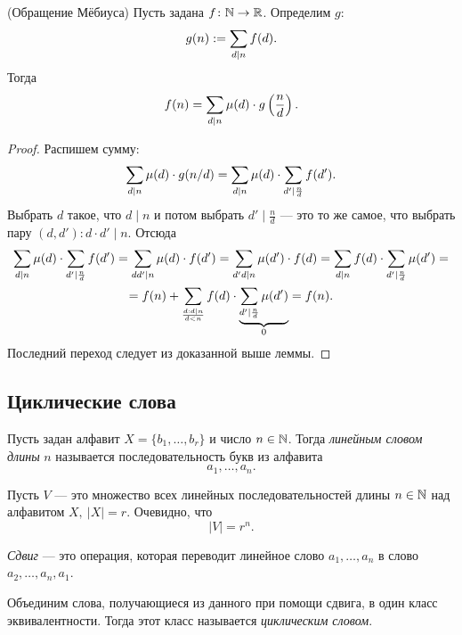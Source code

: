 \begin{theorem} (Обращение Мёбиуса)
	Пусть задана $f \colon \mathbb{N} \rightarrow \mathbb{R}$. Определим $g$:
	\[
		g(n) := \sum\limits_{d \mid n} f(d).
	\]
	Тогда
	\[
		f(n) = \sum\limits_{d \mid n} \mu(d) \cdot g\left(\frac{n}{d}\right).
	\]
\end{theorem}

\begin{proof}
	Распишем сумму:
	\[
		\sum\limits_{d \mid n} \mu(d) \cdot g(n / d) = \sum\limits_{d \mid n} \mu(d) \cdot \sum\limits_{d' \mid \frac{n}{d}} f(d').
	\]
	Выбрать $d$ такое, что $d \mid n$ и потом выбрать $d' \mid \frac{n}{d}$ --- это то же самое, что выбрать пару $(d, d'): d \cdot d' \mid n$. Отсюда
	\begin{multline*}
		\sum\limits_{d \mid n} \mu(d) \cdot \sum\limits_{d' \mid \frac{n}{d}} f(d') = \sum\limits_{dd' \mid n} \mu(d) \cdot f(d') = \sum\limits_{d'd \mid n} \mu(d') \cdot f(d) = \sum\limits_{d \mid n} f(d) \cdot \sum\limits_{d' \mid \frac{n}{d}} \mu(d') =
		\\ =
		f(n) + \sum\limits_{{d: d \mid n} \over d < n} f(d) \cdot \underbrace{\sum\limits_{d' \mid \frac{n}{d}} \mu(d')}_{0} = f(n).
	\end{multline*}
	Последний переход следует из доказанной выше леммы.
\end{proof}

\subsection{Циклические слова}

\begin{definition}
	Пусть задан алфавит $X = \{b_1, \ldots, b_r\}$ и число $n \in \mathbb{N}$. Тогда \textit{линейным словом длины} $n$ называется последовательность букв из алфавита
	\[
		a_1, \ldots, a_n.
	\]
\end{definition}

Пусть $V$ --- это множество всех линейных последовательностей длины $n \in \mathbb{N}$ над алфавитом $X,\ |X| = r$. Очевидно, что
\[
	|V| = r^n.
\]

\begin{definition}
	\textit{Сдвиг} --- это операция, которая переводит линейное слово $a_1, \ldots, a_n$ в слово $a_2, \ldots, a_n, a_1$.
\end{definition}

\begin{definition}
	Объединим слова, получающиеся из данного при помощи сдвига, в один класс эквивалентности. Тогда этот класс называется \textit{циклическим словом}.
\end{definition}

